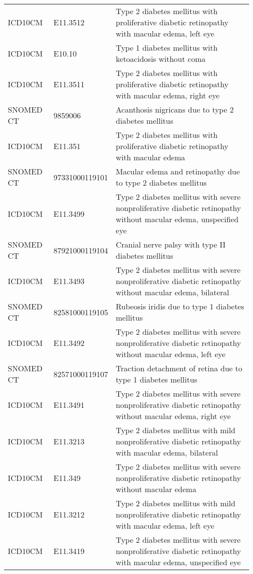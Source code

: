 \begin{table}[ht]
\begin{tabular}{lll}
  ICD10CM & E11.3512 & Type 2 diabetes mellitus with proliferative diabetic retinopathy with macular edema, left eye \\ 
  ICD10CM & E10.10 & Type 1 diabetes mellitus with ketoacidosis without coma \\ 
  ICD10CM & E11.3511 & Type 2 diabetes mellitus with proliferative diabetic retinopathy with macular edema, right eye \\ 
  SNOMED CT & 9859006 & Acanthosis nigricans due to type 2 diabetes mellitus \\ 
  ICD10CM & E11.351 & Type 2 diabetes mellitus with proliferative diabetic retinopathy with macular edema \\ 
  SNOMED CT & 97331000119101 & Macular edema and retinopathy due to type 2 diabetes mellitus \\ 
  ICD10CM & E11.3499 & Type 2 diabetes mellitus with severe nonproliferative diabetic retinopathy without macular edema, unspecified eye \\ 
  SNOMED CT & 87921000119104 & Cranial nerve palsy with type II diabetes mellitus \\ 
  ICD10CM & E11.3493 & Type 2 diabetes mellitus with severe nonproliferative diabetic retinopathy without macular edema, bilateral \\ 
  SNOMED CT & 82581000119105 & Rubeosis iridis due to type 1 diabetes mellitus \\ 
  ICD10CM & E11.3492 & Type 2 diabetes mellitus with severe nonproliferative diabetic retinopathy without macular edema, left eye \\ 
  SNOMED CT & 82571000119107 & Traction detachment of retina due to type 1 diabetes mellitus \\ 
  ICD10CM & E11.3491 & Type 2 diabetes mellitus with severe nonproliferative diabetic retinopathy without macular edema, right eye \\ 
  ICD10CM & E11.3213 & Type 2 diabetes mellitus with mild nonproliferative diabetic retinopathy with macular edema, bilateral \\ 
  ICD10CM & E11.349 & Type 2 diabetes mellitus with severe nonproliferative diabetic retinopathy without macular edema \\ 
  ICD10CM & E11.3212 & Type 2 diabetes mellitus with mild nonproliferative diabetic retinopathy with macular edema, left eye \\ 
  ICD10CM & E11.3419 & Type 2 diabetes mellitus with severe nonproliferative diabetic retinopathy with macular edema, unspecified eye \\ 

\end{tabular}
\end{table}
